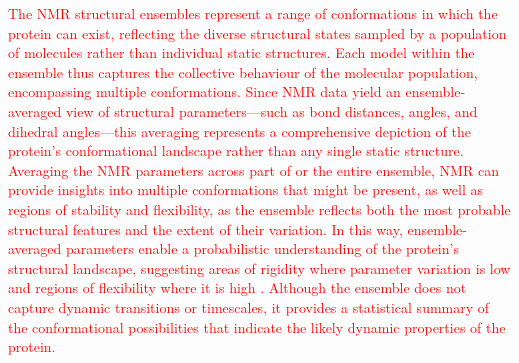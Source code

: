 \textcolor{red}{The NMR structural ensembles represent a range of conformations in which the protein can exist, reflecting the diverse structural states sampled by a population of molecules rather than individual static structures. Each model within the ensemble thus captures the collective behaviour of the molecular population, encompassing multiple conformations. Since NMR data yield an ensemble-averaged view of structural parameters---such as bond distances, angles, and dihedral angles---this averaging represents a comprehensive depiction of the protein’s conformational landscape rather than any single static structure. Averaging the NMR parameters across part of or the entire ensemble, NMR can provide insights into multiple conformations that might be present, as well as regions of stability and flexibility, as the ensemble reflects both the most probable structural features and the extent of their variation. In this way, ensemble-averaged parameters enable a probabilistic understanding of the protein’s structural landscape, suggesting areas of rigidity where parameter variation is low and regions of flexibility where it is high \cite{sutcliffe_representing_1993, stockelmaier_conformational_2024}. Although the ensemble does not capture dynamic transitions or timescales, it provides a statistical summary of the conformational possibilities that indicate the likely dynamic properties of the protein.}





